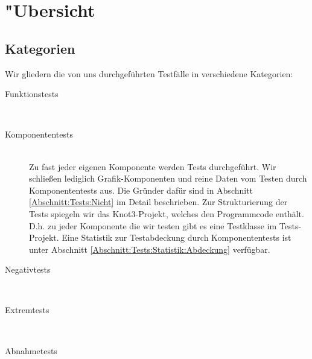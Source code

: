 %



\section{{"U}bersicht}
\label{Abschnitt:Tests:Uebersicht}



\subsection{Kategorien}
\label{Abschnitt:Tests:Uebersicht:Kategorien}

Wir gliedern die von uns durchgeführten Testfälle in verschiedene Kategorien:\\


\begin{description} %


	\item[Funktionstests] \hfill
	\\
	
	
	\item[Komponententests] \hfill
	\\
	
	Zu fast jeder eigenen Komponente werden Tests durchgeführt. Wir schließen lediglich Grafik-Komponenten und reine Daten vom Testen durch Komponententests aus. Die Gründer dafür sind in Abschnitt \ref{Abschnitt:Tests:Nicht} im Detail beschrieben. Zur Strukturierung der Tests spiegeln wir das Knot3-Projekt, welches den Programmcode enthält. D.h. zu jeder Komponente die wir testen gibt es eine Testklasse im Tests-Projekt. Eine Statistik zur Testabdeckung durch Komponententests ist unter Abschnitt \ref{Abschnitt:Tests:Statistik:Abdeckung} verfügbar.\\


	\item[Negativtests] \hfill
	\\

	
	\item[Extremtests] \hfill
	\\


	\item[Abnahmetests] \hfill
	\\
		
\end{description}











